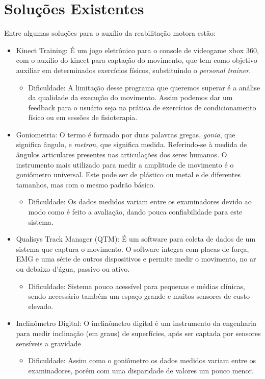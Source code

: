 \section{Soluções Existentes}
\label{Sec:SolucoesExistentes}
Entre algumas soluções para o auxílio da reabilitação motora estão:
\begin{itemize}

\item Kinect Training: É um jogo eletrônico para o console de videogame xbox
360, com o auxílio do kinect para captação do movimento, que tem como objetivo
auxiliar em determinados exercícios físicos, substituindo o \textit{personal trainer}.
  \begin{itemize}
  \item Dificuldade: A limitação desse programa que queremos superar é a
  análise da qualidade da execução do movimento. Assim podemos dar um feedback
  para o usuário seja na prática de exercícios de  condicionamento físico ou em
  sessões de fisioterapia.
  \end{itemize}

\item Goniometria: O termo é formado por duas palavras gregas, \textit{gonia},
que significa ângulo, e \textit{metron}, que significa medida. Referindo-se à
medida de ângulos articulares presentes nas articulações dos seres humanos.
O instrumento mais utilizado para medir a amplitude de movimento é o goniômetro
universal. Este pode ser de plástico ou metal e de diferentes tamanhos, mas com
 o mesmo padrão básico\cite{manualGoniometria}.
  \begin{itemize}
  \item Dificuldade: Os dados medidos variam entre os examinadores devido ao modo como
  é feito a avaliação, dando pouca confiabilidade para este sistema.
  \end{itemize}

\item Qualisys Track Manager (QTM): É um software para coleta de dados de um
sistema que captura o movimento. O software integra com placas de força, EMG
e uma série de outros dispositivos e permite medir o movimento, no ar
ou debaixo d'água, passivo ou ativo\cite{qtm}.
  \begin{itemize}
  \item Dificuldade: Sistema pouco acessível para pequenas e médias clínicas,
  sendo necessário também um espaço grande e muitos sensores de custo elevado.
  \end{itemize}

\item Inclinômetro Digital: O inclinômetro digital é um instrumento da
engenharia para medir inclinação (em graus) de superfícies, após ser captada
por sensores sensíveis a gravidade\cite{erroMedicao2012}
  \begin{itemize}
  \item Dificuldade: Assim como o goniômetro os dados medidos variam entre os
  examinadores, porém com uma disparidade de valores um pouco menor.
  \end{itemize}

\end{itemize}

